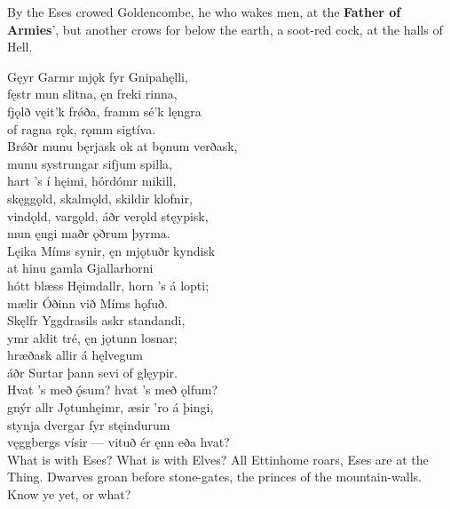 \bvb By the Eses crowed Goldencombe, he who wakes men, at the \textbf{Father of Armies}', but another crows for below the earth, a soot-red cock, at the halls of Hell.

\bva Gęyr Garmr mjǫk \hld fyr Gnipahęlli, \\%
fęstr mun slitna, \hld ęn freki rinna, \\%
fjǫlð vęit'k frǿða, \hld framm sé'k lęngra \\%
of ragna rǫk, \hld rǫmm sigtíva.\\%

\bva Brǿðr munu bęrjask \hld ok at bǫnum verðask, \\%
munu systrungar \hld sifjum spilla, \\%
hart ’s í hęimi, \hld hórdómr mikill, \\%
skęggǫld, skalmǫld, \hld skildir klofnir, \\%
vindǫld, vargǫld, \hld áðr verǫld stęypisk,\footnotemark[1] \\%
mun ęngi maðr \hld ǫðrum þyrma.
\\%

\bva Lęika Míms synir, \hld ęn mjǫtuðr kyndisk \\%
at hinu gamla \hld Gjallarhorni \\%
hótt blæss Hęimdallr, \hld horn ’s á lopti; \\%
mælir Óðinn \hld við Míms hǫfuð.\\%

\bva Skęlfr Yggdrasils \hld askr standandi, \\%
ymr aldit tré, \hld ęn jǫtunn losnar; \\%
hræðask allir \hld á hęlvegum \\%
áðr Surtar þann \hld sevi of glęypir.\\%

\bva Hvat ’s með ǫ́sum? \hld hvat ’s með ǫlfum? \\%
gnýr allr Jǫtunhęimr, \hld æsir ’ro á þingi, \\%
stynja dvergar \hld fyr stęindurum \\%
vęggbergs vísir — \hld vituð ér ęnn eða hvat?\\%

\bvb What is with Eses? What is with Elves? All Ettinhome roars, Eses are at the Thing. Dwarves groan before stone-gates, the princes of the mountain-walls. Know ye yet, or what?

